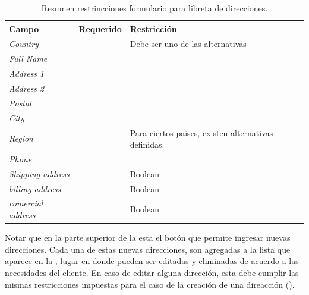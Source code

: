 		\begin{table}[h!]
		    \centering
			\begin{tabular}{ |l|c||l| }
				\hline Campo & Requerido & Restricción \\ \hline
				\multirow{1}{*}{\textit{Country}} 			&  \checkmark 	&  Debe ser uno de las alternativas\\ \hline
				\multirow{1}{*}{\textit{Full Name}} 		&  \checkmark	& \\ \hline
				\multirow{1}{*}{\textit{Address 1}} 		&  \checkmark	& \\ \hline
				\multirow{1}{*}{\textit{Address 2}} 		&  				& \\ \hline
				\multirow{1}{*}{\textit{Postal}} 			&  \checkmark	& \\ \hline
				\multirow{1}{*}{\textit{City}} 				&  \checkmark	& \\ \hline
				\multirow{1}{*}{\textit{Region}} 			&  \checkmark	& Para ciertos paises, existen alternativas definidas.\\ \hline
				\multirow{1}{*}{\textit{Phone}} 			&  \checkmark	& \\ \hline
				\multirow{1}{*}{\textit{Shipping address}} 	&  \checkmark	& Boolean \\ \hline
				\multirow{1}{*}{\textit{billing address}} 	&  \checkmark	& Boolean \\ \hline
				\multirow{1}{*}{\textit{comercial address}} &  \checkmark	& Boolean \\ \hline
			\end{tabular}
		 	\caption{Resumen restrincciones formulario para libreta de direcciones.}
		    \label{tab:profile:form:restrictions:address}
		\end{table}

		Notar que en la parte superior de la  esta el botón que permite ingresar nuevas direcciones. Cada una de estas nuevas direcciones, son agregadas a la lista que aparece en la , lugar en donde pueden ser editadas y eliminadas de acuerdo a las necesidades del cliente. En caso de editar alguna dirección, esta debe cumplir las mismas restricciones impuestas para el caso de la creación de una direacción ().

